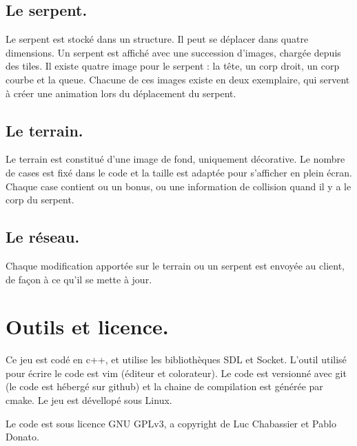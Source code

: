 \documentclass{article}
\begin{document}
\subsection{Le serpent.}
Le serpent est stocké dans un structure. Il peut se déplacer dans quatre dimensions. Un serpent est affiché avec une succession d'images, chargée depuis des tiles. Il existe quatre image pour le serpent : la tête, un corp droit, un corp courbe et la queue. Chacune de ces images existe en deux exemplaire, qui servent à créer une animation lors du déplacement du serpent.

\subsection{Le terrain.}
Le terrain est constitué d'une image de fond, uniquement décorative. Le nombre de cases est fixé dans le code et la taille est adaptée pour s'afficher en plein écran. Chaque case contient ou un bonus, ou une information de collision quand il y a le corp du serpent.

\subsection{Le réseau.}
Chaque modification apportée sur le terrain ou un serpent est envoyée au client, de façon à ce qu'il se mette à jour.

\section{Outils et licence.}
Ce jeu est codé en c++, et utilise les bibliothèques SDL et Socket. L'outil utilisé pour écrire le code est vim (éditeur et colorateur). Le code est versionné avec git (le code est hébergé sur github) et la chaine de compilation est générée par cmake. Le jeu est dévellopé sous Linux.

Le code est sous licence GNU GPLv3, a copyright de Luc Chabassier et Pablo Donato.
\end{document}
